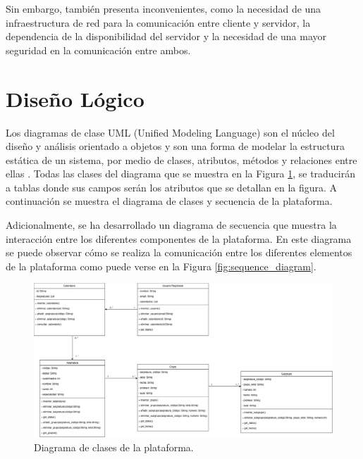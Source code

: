 Sin embargo, también presenta inconvenientes, como la necesidad de una infraestructura de red para la comunicación entre cliente y servidor, la dependencia de la disponibilidad del servidor y la necesidad de una mayor seguridad en la comunicación entre ambos.\newline

\section{Diseño Lógico}

Los diagramas de clase UML (Unified Modeling Language) son el núcleo del diseño y análisis orientado a objetos y son una forma de modelar la estructura estática de un sistema, por medio de clases, atributos, métodos y relaciones entre ellas \cite{herchi2012user}. Todas las clases del diagrama que se muestra en la Figura \ref{fig:class_diagram}, se traducirán a tablas donde sus campos serán los atributos que se detallan en la figura. A continuación se muestra el diagrama de clases y secuencia de la plataforma.\newline

Adicionalmente, se ha desarrollado un diagrama de secuencia que muestra la interacción entre los diferentes componentes de la plataforma. En este diagrama se puede observar cómo se realiza la comunicación entre los diferentes elementos de la plataforma como puede verse en la Figura \ref{fig:sequence_diagram}.\newline

\newpage

\begin{landscape}
    \begin{figure}[H]
        \centering
        \includegraphics[width=1.6\textwidth]{./imagenes/Class_Diagram.png}
        \caption{Diagrama de clases de la plataforma.}
        \label{fig:class_diagram}
    \end{figure}  
\end{landscape}

